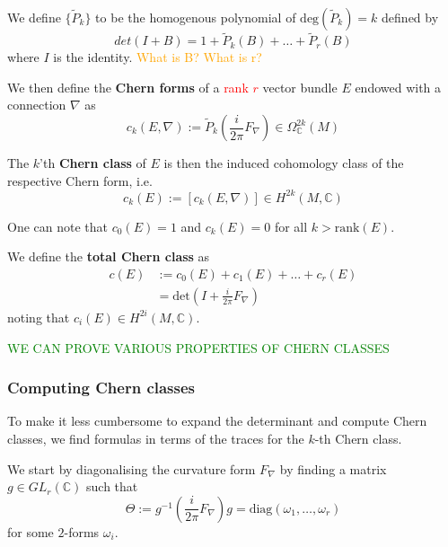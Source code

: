 \documentclass[a4paper]{article}
\theoremstyle{definition} \newtheorem*{definition}{Definition}
\theoremstyle{definition} \newtheorem*{definitions}{Definitions}
\theoremstyle{plain} \newtheorem{theorem}{Theorem}[section]
\theoremstyle{plain} \newtheorem{proposition}[theorem]{Proposition}
\theoremstyle{plain} \newtheorem{corollary}[theorem]{Corollary}
\theoremstyle{plain} \newtheorem{lemma}[theorem]{Lemma}
\theoremstyle{plain} \newtheorem{example}[theorem]{Example}
\newcommand{\checkCorrect}[1]{\textcolor{red}{#1}}
\newcommand{\question}[1]{\textcolor{orange}{#1}}
\newcommand{\finish}[1]{\textcolor{green}{#1}}
\newcommand{\defn}[1]{\textbf{#1}}
\newcommand{\complexnos}{\mathbb{C}}
\begin{document}
We define $\{\tilde{P}_k\}$ to be the homogenous polynomial of $\text{deg}(\tilde{P}_k)=k$ defined by 
$$det(I+B)=1+\tilde{P}_k(B)+\ldots +\tilde{P}_r(B)$$
where $I$ is the identity. \question{What is B? What is r?}

We then define the \defn{Chern forms} of a \checkCorrect{rank $r$} vector bundle $E$ endowed with a connection $\nabla$ as
$$c_k(E, \nabla):=\tilde{P}_k \left( \frac{i}{2\pi} F_\nabla \right) \in \Omega^{2k}_\complexnos (M)$$

The $k$'th \defn{Chern class} of $E$ is then the induced cohomology class of the respective Chern form, i.e. 
$$c_k(E):= [c_k(E, \nabla)] \in H^{2k}(M, \complexnos)$$

One can note that $c_0(E)=1$ and $c_k(E)=0$ for all $k>\text{rank}(E)$. 

We define the \defn{total Chern class} as 
\begin{align*}
c(E)& :=c_0(E)+c_1(E)+\ldots +c_r(E) \\
& = \text{det} \left( I + \frac{i}{2\pi} F_\nabla \right)
\end{align*}
noting that $c_i(E)\in H^{2i}(M, \complexnos)$.

\finish{WE CAN PROVE VARIOUS PROPERTIES OF CHERN CLASSES}

\subsubsection{Computing Chern classes}
To make it less cumbersome to expand the determinant and compute Chern classes, we find formulas in terms of the traces for the $k$-th Chern class. 

We start by diagonalising the curvature form $F_\nabla$ by finding a matrix $g\in GL_r(\complexnos)$ such that
$$\Theta := g^{-1}\left( \frac{i}{2\pi} F_\nabla \right) g = \text{diag}(\omega_1, \ldots, \omega_r)$$
for some $2$-forms $\omega_i$. 
\end{document}

